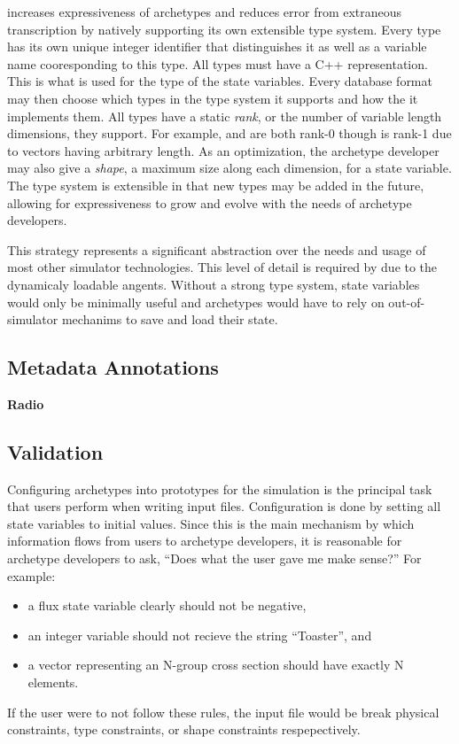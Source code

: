 \Cyclus increases expressiveness of archetypes and reduces error from extraneous 
transcription by natively supporting its own extensible type system. Every type
has its own unique integer identifier that distinguishes it as well as 
a variable name cooresponding to this type. All types
must have a C++ representation. This is what is used for the type of the state
variables. Every database format may then choose which types in the type system it 
supports and how the it implements them. All types have a static \emph{rank}, or the 
number of variable length dimensions, they support.  For example,  and 
 are both rank-0 though  is rank-1 due to 
vectors having arbitrary length. As an optimization, the archetype developer 
may also give a \emph{shape}, a maximum size along each dimension, for a state 
variable. The type system is extensible in that new types may be added in the future, 
allowing for expressiveness to grow and evolve with the needs of archetype developers.

This strategy represents a significant abstraction over the needs and usage of most 
other simulator technologies. This level of detail is required by \cyclus due to the
dynamicaly loadable angents. Without a strong type system, state variables 
would only be minimally useful and archetypes would have to rely on out-of-simulator
mechanims to save and load their state.

\subsection{Metadata Annotations}

\textbf{Radio}

\subsection{Validation}

Configuring archetypes into prototypes for the simulation is the principal task 
that users perform when writing \cyclus input files. Configuration is done by 
setting all state variables to initial values. Since this is the main mechanism 
by which information flows from users to archetype developers, it is reasonable for
archetype developers to ask, ``Does what the user gave me make sense?'' For example:
\begin{itemize} 
    \item a flux state variable clearly should not be negative, 
    \item an integer variable should not recieve the string ``Toaster'', and
    \item a vector representing an N-group cross section should have exactly N 
          elements.
\end{itemize} 
If the user were to not follow these rules, the input file would be break physical
constraints, type constraints, or shape constraints respepectively. 

